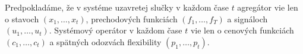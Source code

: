 
Predpokladáme, že v systéme uzavretej slučky v každom čase $t$ agregátor vie len o stavoch $(x_{1},\dots,x_{t})$, prechodových funkciách $(f_{1},\dots, f_{T})$ a signáloch $(u_{1}, \dots, u_{t})$. Systémový operátor v každom čase $t$ vie len o cenových funkciách $(c_{1}, \dots, c_{t})$ a spätných odozvách flexibility $(p_{1},\dots, p_{t})$.




















